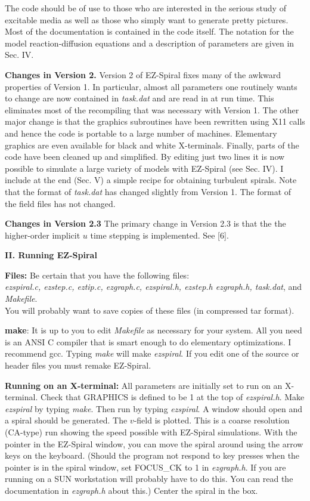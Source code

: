 The code should be of use to those who are interested in the serious
study of excitable media as well as those who simply want to generate
pretty pictures. Most of the documentation is contained in the code
itself. The notation for the model reaction-diffusion equations and a
description of parameters are given in Sec. IV.

{\bf Changes in Version 2.}  Version 2 of EZ-Spiral fixes many of the
awkward properties of Version 1.  In particular, almost all parameters
one routinely wants to change are now contained in {\em task.dat} and
are read in at run time.  This eliminates most of the recompiling that
was necessary with Version 1.  The other major change is that the
graphics subroutines have been rewritten using X11 calls and hence the
code is portable to a large number of machines.  Elementary graphics
are even available for black and white X-terminals.  Finally, parts of
the code have been cleaned up and simplified.  By editing just two
lines it is now possible to simulate a large variety of models with
EZ-Spiral (see Sec. IV).  I include at the end (Sec. V) a simple
recipe for obtaining turbulent spirals.  Note that the format of {\em
task.dat} has changed slightly from Version 1.  The format of the
field files has not changed.

{\bf Changes in Version 2.3} The primary change in Version 2.3 is that
the the higher-order implicit $u$ time stepping is implemented.  See [6].

\pagebreak

\medskip
{\bf II. Running EZ-Spiral} 
\smallskip

{\bf Files:} Be certain that you have the following files: \\ {\em
ezspiral.c, ezstep.c, eztip.c, ezgraph.c, ezspiral.h, ezstep.h
ezgraph.h, task.dat}, and {\em Makefile}. \\ You will probably want to
save copies of these files (in compressed tar format).

{\bf make}: It is up to you to edit {\em Makefile} as necessary for
your system. All you need is an ANSI C compiler that is smart enough
to do elementary optimizations. I recommend gcc. Typing {\em make}
will make {\em ezspiral}.  If you edit one of the source or header
files you must remake EZ-Spiral.

{\bf Running on an X-terminal:} All parameters are initially set to
run on an X-terminal. Check that {\sf GRAPHICS} is defined to be 1 at
the top of {\em ezspiral.h}. Make {\em ezspiral} by typing {\em
make}. Then run by typing {\em ezspiral}. A window should open and a
spiral should be generated.  The $v$-field is plotted. This is a
coarse resolution (CA-type) run showing the speed possible with
EZ-Spiral simulations.  With the pointer in the EZ-Spiral window, you
can move the spiral around using the arrow keys on the keyboard.
(Should the program not respond to key presses when the pointer is in
the spiral window, set {\sf FOCUS\_CK} to 1 in {\em ezgraph.h}.  If
you are running on a SUN workstation will probably have to do this.
You can read the documentation in {\em ezgraph.h} about this.)  Center
the spiral in the box.

